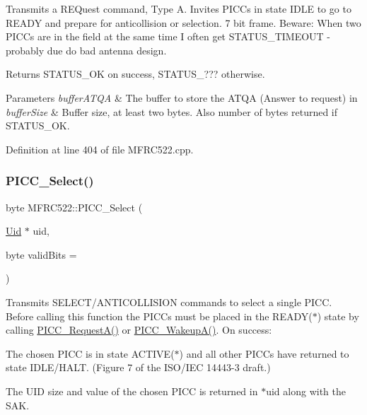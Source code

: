 Transmits a R\+E\+Quest command, Type A. Invites P\+I\+C\+Cs in state I\+D\+LE to go to R\+E\+A\+DY and prepare for anticollision or selection. 7 bit frame. Beware\+: When two P\+I\+C\+Cs are in the field at the same time I often get S\+T\+A\+T\+U\+S\+\_\+\+T\+I\+M\+E\+O\+UT -\/ probably due do bad antenna design.

\begin{DoxyReturn}{Returns}
S\+T\+A\+T\+U\+S\+\_\+\+OK on success, S\+T\+A\+T\+U\+S\+\_\+??? otherwise. 
\end{DoxyReturn}

\begin{DoxyParams}{Parameters}
{\em buffer\+A\+T\+QA} & The buffer to store the A\+T\+QA (Answer to request) in \\
\hline
{\em buffer\+Size} & Buffer size, at least two bytes. Also number of bytes returned if S\+T\+A\+T\+U\+S\+\_\+\+OK. \\
\hline
\end{DoxyParams}


Definition at line 404 of file M\+F\+R\+C522.\+cpp.

\mbox{\label{class_m_f_r_c522_ab40449ac80501db28d25889612bb2db0}} 
\subsubsection{\texorpdfstring{P\+I\+C\+C\+\_\+\+Select()}{PICC\_Select()}}
{\footnotesize\ttfamily byte M\+F\+R\+C522\+::\+P\+I\+C\+C\+\_\+\+Select (\begin{DoxyParamCaption}\item[{\hyperlink{struct_m_f_r_c522_1_1_uid}{Uid} $\ast$}]{uid,  }\item[{byte}]{valid\+Bits = {} }\end{DoxyParamCaption})}

Transmits S\+E\+L\+E\+C\+T/\+A\+N\+T\+I\+C\+O\+L\+L\+I\+S\+I\+ON commands to select a single P\+I\+CC. Before calling this function the P\+I\+C\+Cs must be placed in the R\+E\+A\+D\+Y($\ast$) state by calling \hyperlink{class_m_f_r_c522_a6db371f6ca95e8ea22445124c79012cc}{P\+I\+C\+C\+\_\+\+Request\+A()} or \hyperlink{class_m_f_r_c522_a009dfa9138c6f999af82d7fc5b17a272}{P\+I\+C\+C\+\_\+\+Wakeup\+A()}. On success\+:
\begin{DoxyItemize}
\item The chosen P\+I\+CC is in state A\+C\+T\+I\+V\+E($\ast$) and all other P\+I\+C\+Cs have returned to state I\+D\+L\+E/\+H\+A\+LT. (Figure 7 of the I\+S\+O/\+I\+EC 14443-\/3 draft.)
\item The U\+ID size and value of the chosen P\+I\+CC is returned in $\ast$uid along with the S\+AK.
\end{DoxyItemize}

